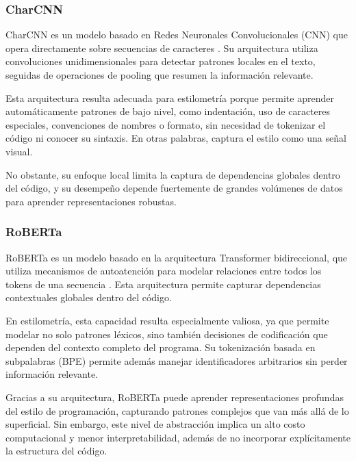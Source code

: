 \subsubsection{CharCNN}

CharCNN es un modelo basado en Redes Neuronales Convolucionales (CNN) que opera directamente sobre secuencias de caracteres \cite{Zhang2015CharCNN}. Su arquitectura utiliza convoluciones unidimensionales para detectar patrones locales en el texto, seguidas de operaciones de pooling que resumen la información relevante.

Esta arquitectura resulta adecuada para estilometría porque permite aprender automáticamente patrones de bajo nivel, como indentación, uso de caracteres especiales, convenciones de nombres o formato, sin necesidad de tokenizar el código ni conocer su sintaxis. En otras palabras, captura el estilo como una señal visual.

No obstante, su enfoque local limita la captura de dependencias globales dentro del código, y su desempeño depende fuertemente de grandes volúmenes de datos para aprender representaciones robustas.

\subsubsection{RoBERTa}

RoBERTa es un modelo basado en la arquitectura Transformer bidireccional, que utiliza mecanismos de autoatención para modelar relaciones entre todos los tokens de una secuencia \cite{Liu2019RoBERTa}. Esta arquitectura permite capturar dependencias contextuales globales dentro del código.

En estilometría, esta capacidad resulta especialmente valiosa, ya que permite modelar no solo patrones léxicos, sino también decisiones de codificación que dependen del contexto completo del programa. Su tokenización basada en subpalabras (BPE) permite además manejar identificadores arbitrarios sin perder información relevante.

Gracias a su arquitectura, RoBERTa puede aprender representaciones profundas del estilo de programación, capturando patrones complejos que van más allá de lo superficial. Sin embargo, este nivel de abstracción implica un alto costo computacional y menor interpretabilidad, además de no incorporar explícitamente la estructura del código.

